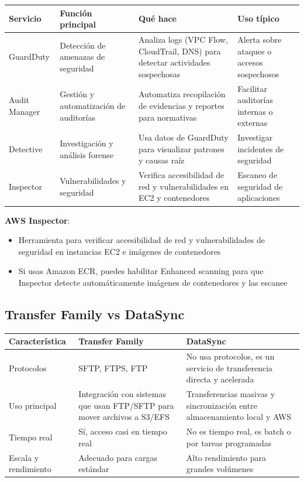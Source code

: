 \documentclass[12pt,a4paper]{report}
\begin{document}
\begin{center}
\begin{longtable}{|p{2.5cm}|p{4cm}|p{4.5cm}|p{3.5cm}|}
\hline
\cellcolor{awsblue!20}\textbf{Servicio} & \cellcolor{awsblue!20}\textbf{Función principal} & \cellcolor{awsblue!20}\textbf{Qué hace} & \cellcolor{awsblue!20}\textbf{Uso típico} \\
\hline
\cellcolor{dangerred!20}GuardDuty & Detección de amenazas de seguridad & Analiza logs (VPC Flow, CloudTrail, DNS) para detectar actividades sospechosas & Alerta sobre ataques o accesos sospechosos \\
\hline
Audit Manager & Gestión y automatización de auditorías & Automatiza recopilación de evidencias y reportes para normativas & Facilitar auditorías internas o externas \\
\hline
Detective & Investigación y análisis forense & Usa datos de GuardDuty para visualizar patrones y causas raíz & Investigar incidentes de seguridad \\
\hline
\cellcolor{warningyellow!20}Inspector & Vulnerabilidades y seguridad & Verifica accesibilidad de red y vulnerabilidades en EC2 y contenedores & Escaneo de seguridad de aplicaciones \\
\hline
\end{longtable}
\end{center}

\textbf{AWS Inspector}:
\begin{itemize}
    \item Herramienta para verificar accesibilidad de red y vulnerabilidades de seguridad en instancias EC2 e imágenes de contenedores
    \item Si usas Amazon ECR, puedes habilitar Enhanced scanning para que Inspector detecte automáticamente imágenes de contenedores y las escanee
\end{itemize}

\subsection{Transfer Family vs DataSync}

\begin{center}
\begin{longtable}{|p{3cm}|p{5.5cm}|p{5.5cm}|}
\hline
\cellcolor{awsblue!20}\textbf{Característica} & \cellcolor{awsblue!20}\textbf{Transfer Family} & \cellcolor{awsblue!20}\textbf{DataSync} \\
\hline
Protocolos & SFTP, FTPS, FTP & No usa protocolos, es un servicio de transferencia directa y acelerada \\
\hline
Uso principal & Integración con sistemas que usan FTP/SFTP para mover archivos a S3/EFS & Transferencias masivas y sincronización entre almacenamiento local y AWS \\
\hline
Tiempo real & Sí, acceso casi en tiempo real & No es tiempo real, es batch o por tareas programadas \\
\hline
Escala y rendimiento & Adecuado para cargas estándar & Alto rendimiento para grandes volúmenes \\
\hline
\end{longtable}
\end{center}
\end{document}
